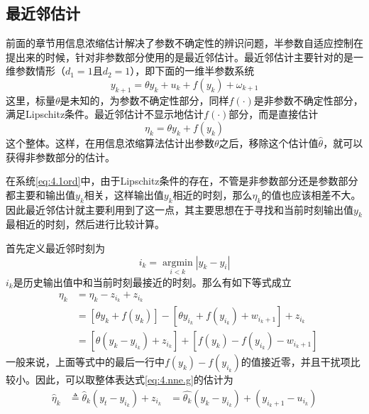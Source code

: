 \subsection{最近邻估计}
前面的章节用信息浓缩估计解决了参数不确定性的辨识问题，半参数自适应控制在提出来的时候，针对非参数部分使用的是最近邻估计。最近邻估计主要针对的是一维参数情形（$d_{1}=1$且$d_{2}=1$），即下面的一维半参数系统
\begin{equation}%
\label{eq:4.1ord}
y_{k+1}=\theta y_{k}+u_{k}+f(y_{k})+\omega_{k+1}
\end{equation}
这里，标量$\theta$是未知的，为参数不确定性部分，同样$f(\cdot)$是非参数不确定性部分，满足Lipschitz条件。最近邻估计不显示地估计$f(\cdot)$部分，而是直接估计
\begin{equation}\label{eq:4.nne.g}
\eta_{k} = \theta y_{k}+f(y_{k})
\end{equation}
这个整体。这样，在用信息浓缩算法估计出参数$\theta$之后，移除这个估计值$\hat{\theta}$，就可以获得非参数部分的估计。

在系统\eqref{eq:4.1ord}中，由于Lipschitz条件的存在，不管是非参数部分还是参数部分都主要和输出值$y_{k}$相关，这样输出值$y_{k}$相近的时刻，那么$\eta_{k}$的值也应该相差不大。因此最近邻估计就主要利用到了这一点，其主要思想在于寻找和当前时刻输出值$y_{k}$最相近的时刻，然后进行比较计算。

首先定义最近邻时刻为
\begin{equation}\label{eq:4.it}
i_k=\mathop{\arg \min}\limits_{i<k}|y_k-y_i|
\end{equation}
$i_k$是历史输出值中和当前时刻最接近的时刻。那么有如下等式成立
\begin{equation*}
\begin{array}{lll}
&\eta_k&=\eta_k-z_{i_k}+z_{i_k}\\
&&=[\theta y_k+f(y_k)]-[\theta y_{i_k}+f(y_{i_k})+w_{i_k+1}]+z_{i_k}\\
&&=[\theta(y_k-y_{i_k})+z_{i_k}]+[f(y_k)-f(y_{i_k})-w_{i_k+1}]
\end{array}
\end{equation*}
一般来说，上面等式中的最后一行中$f(y_k)-f(y_{i_k})$的值接近零，并且干扰项比较小。因此，可以取整体表达式\eqref{eq:4.nne.g}的估计为
\begin{equation}\label{eq.4:g.est}
\begin{array}{lll}
\hat{\eta}_k&\triangleq\hat{\theta}_k(y_t-y_{i_k})+z_{i_k}
&=\hat{\theta_k}(y_k-y_{i_k})+(y_{i_k+1}-u_{i_k})
\end{array}
\end{equation}

